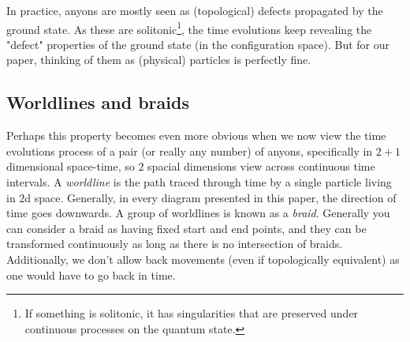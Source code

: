 \documentclass{article}
\begin{document}
In practice, anyons are mostly seen as (topological) defects propagated by the ground state. As these are solitonic\footnote{\label{Solitonic} If something is solitonic, it has singularities that are preserved under continuous processes on the quantum state.}, the time evolutions keep revealing the "defect" properties of the ground state (in the configuration space). But for our paper, thinking of them as (physical) particles is perfectly fine.



\subsection{Worldlines and braids}
\label{AnyonInstantiationAndFusion}
Perhaps this property becomes even more obvious when we now view the time evolutions process of a pair (or really any number) of anyons, specifically in $2 + 1$ dimensional space-time, so $2$ spacial dimensions view across continuous time intervals. A {\it worldline} is the path traced through time by a single particle living in $2$d space. Generally, in every diagram presented in this paper, the direction of time goes downwards. A group of worldlines is known as a {\it braid}. Generally you can consider a braid as having fixed start and end points, and they can be transformed continuously as long as there is no intersection of braids. Additionally, we don't allow back movements (even if topologically equivalent) as one would have to go back in time.
\end{document}
